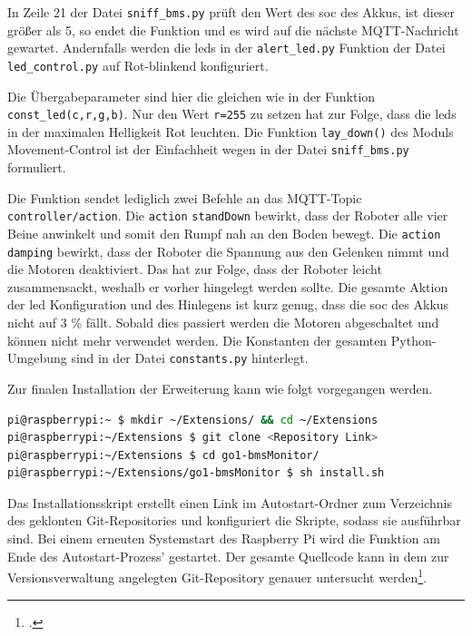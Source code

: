 In Zeile \num{21} der Datei \texttt{sniff\_bms.py} prüft den Wert des \gls{soc} des Akkus, ist dieser größer als \num{5},
so endet die Funktion und es wird auf die nächste MQTT-Nachricht gewartet.
Andernfalls werden die \glspl{led} in der \texttt{alert\_led.py} Funktion der Datei \texttt{led\_control.py}
auf Rot-blinkend konfiguriert.



\noindent Die Übergabeparameter sind hier die gleichen wie in der Funktion \texttt{const\_led(c,r,g,b)}.
Nur den Wert \texttt{r=255} zu setzen hat zur Folge, dass die \glspl{led} in der maximalen Helligkeit Rot leuchten.
Die Funktion \texttt{lay\_down()} des Moduls Movement-Control ist der Einfachheit wegen in der Datei \texttt{sniff\_bms.py}
formuliert.



\noindent Die Funktion sendet lediglich zwei Befehle an das MQTT-Topic \texttt{controller/action}.
Die \texttt{action} \texttt{standDown} bewirkt, dass der Roboter alle vier Beine anwinkelt und somit den Rumpf nah an
den Boden bewegt.
Die \texttt{action} \texttt{damping} bewirkt, dass der Roboter die Spannung aus den Gelenken nimmt und die Motoren deaktiviert.
Das hat zur Folge, dass der Roboter leicht zusammensackt, weshalb er vorher hingelegt werden sollte.
Die gesamte Aktion der \gls{led} Konfiguration und des Hinlegens ist kurz genug, dass die \gls{soc} des Akkus nicht auf
\num{3} \% fällt.
Sobald dies passiert werden die Motoren abgeschaltet und können nicht mehr verwendet werden.
Die Konstanten der gesamten Python-Umgebung sind in der Datei \texttt{constants.py} hinterlegt.



\noindent Zur finalen Installation der Erweiterung kann wie folgt vorgegangen werden.

\begin{lstlisting}[language=Bash]
pi@raspberrypi:~ $ mkdir ~/Extensions/ && cd ~/Extensions
pi@raspberrypi:~/Extensions $ git clone <Repository Link>
pi@raspberrypi:~/Extensions $ cd go1-bmsMonitor/
pi@raspberrypi:~/Extensions/go1-bmsMonitor $ sh install.sh
\end{lstlisting}

\noindent Das Installationsskript erstellt einen Link im Autostart-Ordner zum Verzeichnis des geklonten Git-Repositories und
konfiguriert die Skripte, sodass sie ausführbar sind.
Bei einem erneuten Systemstart des Raspberry Pi wird die Funktion am Ende des Autostart-Prozess' gestartet.
Der gesamte Quellcode kann in dem zur Versionsverwaltung angelegten Git-Repository genauer untersucht werden\footcite{git-bms-monitor}.
